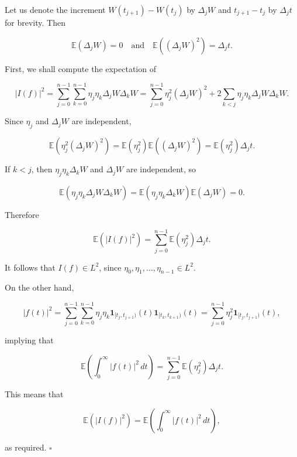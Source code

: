 \begin{Proof}
Let us denote the increment $W(t_{j+1}) - W(t_j)$ by $\Delta_j W$ and $t_{j+1} - t_j$ by $\Delta_j t$ for brevity. Then

\begin{equation}
\mathbb{E}(\Delta_j W) = 0 \quad \text{and} \quad \mathbb{E}\left((\Delta_j W)^2\right) = \Delta_j t.
\end{equation}

First, we shall compute the expectation of

\begin{equation}
|I(f)|^2 = \sum_{j=0}^{n-1} \sum_{k=0}^{n-1} \eta_j \eta_k \Delta_j W \Delta_k W = \sum_{j=0}^{n-1} \eta_j^2 (\Delta_j W)^2 + 2\sum_{k < j} \eta_j \eta_k \Delta_j W \Delta_k W.
\end{equation}

Since $\eta_j$ and $\Delta_j W$ are independent,

\begin{equation}
\mathbb{E}\left(\eta_j^2 (\Delta_j W)^2\right) = \mathbb{E}\left(\eta_j^2\right) \mathbb{E}\left((\Delta_j W)^2\right) = \mathbb{E}\left(\eta_j^2\right) \Delta_j t.
\end{equation}

If $k < j$, then $\eta_j \eta_k \Delta_k W$ and $\Delta_j W$ are independent, so

\begin{equation}
\mathbb{E}\left(\eta_j \eta_k \Delta_j W \Delta_k W\right) = \mathbb{E}\left(\eta_j \eta_k \Delta_k W\right) \mathbb{E}\left(\Delta_j W\right) = 0.
\end{equation}

Therefore

\begin{equation}
\mathbb{E}\left(|I(f)|^2\right) = \sum_{j=0}^{n-1} \mathbb{E}\left(\eta_j^2\right) \Delta_j t.
\end{equation}

It follows that $I(f) \in L^2$, since $\eta_0, \eta_1, \ldots, \eta_{n-1} \in L^2$.

On the other hand,

\begin{equation}
|f(t)|^2 = \sum_{j=0}^{n-1} \sum_{k=0}^{n-1} \eta_j \eta_k \mathbf{1}_{[t_j, t_{j+1})}(t) \mathbf{1}_{[t_k, t_{k+1})}(t) = \sum_{j=0}^{n-1} \eta_j^2 \mathbf{1}_{[t_j, t_{j+1})}(t),
\end{equation}

implying that

\begin{equation}
\mathbb{E}\left(\int_0^\infty |f(t)|^2 \, dt\right) = \sum_{j=0}^{n-1} \mathbb{E}\left(\eta_j^2\right) \Delta_j t.
\end{equation}

This means that

\begin{equation}
\mathbb{E}\left(|I(f)|^2\right) = \mathbb{E}\left(\int_0^\infty |f(t)|^2 \, dt\right),
\end{equation}

as required. \hfill $\square$
\end{Proof}

